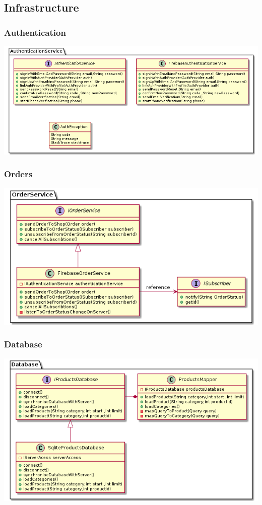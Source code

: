 \documentclass{article}
\begin{document}
\subsection{Infrastructure}

\subsubsection{Authentication}
\includegraphics[scale=0.5]{./out/MobileApp/Infrastructure/Authentication/Authentication.png}

\subsubsection{Orders}
\includegraphics[scale=0.5]{./out/MobileApp/Infrastructure/Orders/Orders.png}

\subsubsection{Database}
\includegraphics[scale=0.5]{./out/MobileApp/Infrastructure/Database/Database.png}
 
\end{document}
